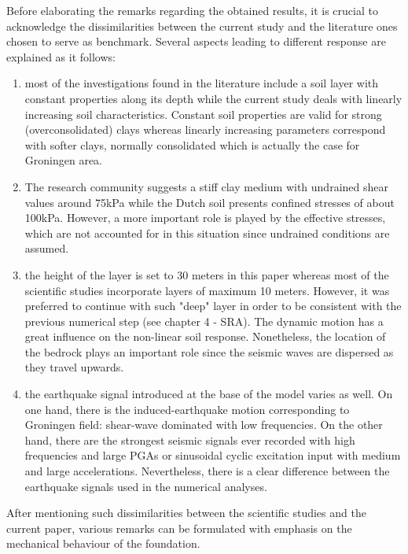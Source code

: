 \newpage
Before elaborating the remarks regarding the obtained results, it is crucial to acknowledge the dissimilarities between the current study and the literature ones chosen to serve as benchmark. Several aspects leading to different response are explained as it follows:
\begin{enumerate}
	\item most of the investigations found in the literature include a soil layer with constant \mbox{properties} along its depth while the current study deals with linearly increasing soil characteristics. Constant soil properties are valid for strong (overconsolidated) clays whereas linearly increasing parameters correspond with softer clays, normally consolidated which is actually the case for Groningen area. 
	\item The research community suggests a stiff clay medium with undrained shear values around 75kPa while the Dutch soil presents confined stresses of about 100kPa. However, a more important role is played by the effective stresses, which are not accounted for in this situation since undrained conditions are assumed.
	\item the height of the layer is set to 30 meters in this paper whereas most of the scientific studies incorporate layers of maximum 10 meters. However, it was preferred to continue with such "deep" layer in order to be consistent with the previous numerical step (see chapter 4 - SRA). The dynamic motion has a great influence on the non-linear soil response. Nonetheless, the location of the bedrock plays an important role since the seismic waves are dispersed as they travel upwards.
	\item the earthquake signal introduced at the base of the model varies as well. On one hand, there is the induced-earthquake motion corresponding to Groningen field: shear-wave dominated with low frequencies. On the other hand, there are the strongest seismic signals ever recorded with high frequencies and large PGAs or sinusoidal cyclic excitation input with medium and large accelerations. Nevertheless, there is a clear difference between the earthquake signals used in the numerical analyses. 
\end{enumerate}

After mentioning such dissimilarities between the scientific studies and the current paper, various remarks can be formulated with emphasis on the mechanical behaviour of the foundation. 


 
